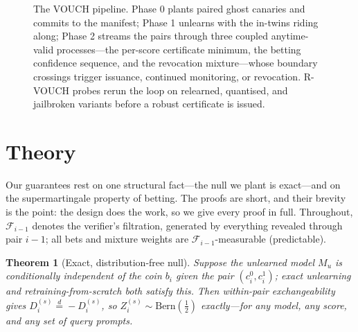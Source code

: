 \documentclass[pdflatex,sn-mathphys-num]{sn-jnl}
\theoremstyle{thmstyleone}
\newtheorem{theorem}{Theorem}
\theoremstyle{thmstyletwo}
\theoremstyle{thmstylethree}
\newcommand{\F}{\mathcal{F}}
\newcommand{\Bern}{\mathrm{Bern}}
\begin{document}
\begin{figure}[t]
{}
\caption{The VOUCH pipeline. Phase 0 plants paired ghost canaries and commits to the
manifest; Phase 1 unlearns with the in-twins riding along; Phase 2 streams the pairs
through three coupled anytime-valid processes---the per-score certificate minimum, the
betting confidence sequence, and the revocation mixture---whose boundary crossings
trigger issuance, continued monitoring, or revocation. R-VOUCH probes rerun the loop
on relearned, quantised, and jailbroken variants before a robust certificate is
issued.}
\label{fig:flowchart}
\end{figure}

\section{Theory}\label{sec:theory}

Our guarantees rest on one structural fact---the null we plant is exact---and on the
supermartingale property of betting. The proofs are short, and their brevity is the
point: the design does the work, so we give every proof in full. Throughout,
$\F_{i-1}$ denotes the verifier's filtration, generated by everything revealed through
pair $i-1$; all bets and mixture weights are $\F_{i-1}$-measurable (predictable).

\begin{theorem}[Exact, distribution-free null]\label{thm:null}
Suppose the unlearned model $M_u$ is conditionally independent of the coin $b_i$ given
the pair $(c_i^0, c_i^1)$; exact unlearning and retraining-from-scratch both satisfy
this. Then within-pair exchangeability gives $D_i^{(s)} \overset{d}{=} -D_i^{(s)}$, so
$Z_i^{(s)} \sim \Bern(\tfrac12)$ exactly---for any model, any score, and any set of
query prompts.
\end{theorem}
\end{document}
